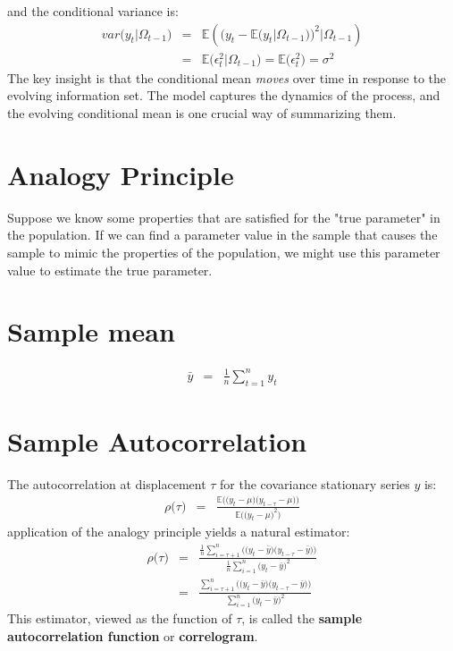 and the conditional variance is:
\begin{eqnarray}
\nonumber
var\Big(y_{t}\vert\Omega_{t - 1}\Big) &=& \mathbb{E}\left(\bigg(y_{t} - \mathbb{E}\Big(y_{t}\vert\Omega_{t - 1}\Big)\bigg)^{2}\vert\Omega_{t - 1}\right)\\
 &=& \mathbb{E}\Big(\epsilon_{t}^{2}\vert\Omega_{t - 1}\Big) = \mathbb{E}\Big(\epsilon_{t}^{2}\Big) = \sigma^{2}
\end{eqnarray}
The key insight is that the conditional mean \textit{moves} over time in response to the evolving information set. The model captures the dynamics of the process, and the evolving conditional mean is one crucial way of summarizing them.

\section{Analogy Principle}
Suppose we know some properties that are satisfied for the "true parameter" in the population. If we can find a parameter value in the sample that causes the sample to mimic the properties of the population, we might use this parameter value to estimate the true parameter.

\section{Sample mean}
\begin{eqnarray}
 \bar{y} &=& \frac{1}{n}\sum_{t = 1}^{n}y_{t}
\end{eqnarray}

\section{Sample Autocorrelation}
The autocorrelation at displacement $\tau$ for the covariance stationary series $y$ is:
\begin{eqnarray}
	\rho\big(\tau\big) &=& \frac{\mathbb{E}\bigg(\Big(y_{t} - \mu\Big) \Big(y_{t - \tau} - \mu\Big)\bigg)}{\mathbb{E}\bigg(\Big(y_{t} - \mu\Big)^{2}\bigg)}
\end{eqnarray}
application of the analogy principle yields a natural estimator:
\begin{eqnarray}
	\nonumber
	\rho\big(\tau\big) &=& \frac{\frac{1}{n}\sum_{i = \tau + 1}^{n}\bigg(\Big(y_{t} - \bar{y}\Big) \Big(y_{t - \tau} - \bar{y}\Big)\bigg)}{\frac{1}{n}\sum_{i = 1}^{n}\bigg(y_{t} - \bar{y}\bigg)^{2}}\\
&=& \frac{\sum_{i = \tau + 1}^{n}\bigg(\Big(y_{t} - \bar{y}\Big) \Big(y_{t - \tau} - \bar{y}\Big)\bigg)}{\sum_{i = 1}^{n}\bigg(y_{t} - \bar{y}\bigg)^{2}}
\end{eqnarray}
This estimator, viewed as the function of $\tau$, is called the \textbf{\color{blue}sample autocorrelation function} or \textbf{\color{blue}correlogram}.

